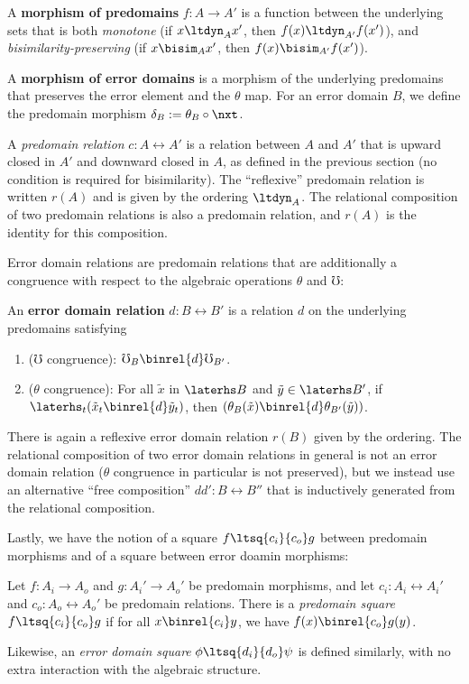 \documentclass[acmsmall, screen]{acmart}
\theoremstyle{remark}
\begin{document}
A \textbf{morphism of predomains} $f : A \to A'$ is a function between the
underlying sets that is both \emph{monotone} (if $x \ltdyn_A x'$, then $f(x)
\ltdyn_{A'} f(x')$), and \emph{bisimilarity-preserving} (if $x \bisim_A x'$,
then $f(x) \bisim_{A'} f(x')$).

A \textbf{morphism of error domains} is a morphism of the underlying predomains
that preserves the error element and the $\theta$ map.
%
For an error domain $B$, we define the predomain morphism $\delta_B := \theta_B
\circ \nxt$.

A \emph{predomain relation} $c : A \rel A'$ is a relation between $A$ and $A'$
that is upward closed in $A'$ and downward closed in $A$, as defined in the
previous section (no condition is required for bisimilarity). The ``reflexive''
predomain relation is written $r(A)$ and is given by the ordering $\ltdyn_A$.
The relational composition of two predomain relations is also a predomain
relation, and $r(A)$ is the identity for this composition.

Error domain relations are predomain relations that are additionally a
congruence with respect to the algebraic operations $\theta$ and $\mho$:
%
\begin{definition}
  An \textbf{error domain relation} $d : B \rel B'$ is a relation $d$ on the
  underlying predomains satisfying
  \begin{enumerate}
     \item ($\mho$ congruence): $\mho_B \binrel{d} \mho_{B'}$.
     \item ($\theta$ congruence): For all $\tilde{x}$ in $\laterhs B$ and
     $\tilde{y} \in \laterhs B'$, if $\laterhs_t (\tilde{x}_t \binrel{d}
     \tilde{y}_t)$, then $(\theta_B (\tilde{x}) \binrel{d} \theta_{B'}
     (\tilde{y}))$. 
  \end{enumerate}
\end{definition}
%
There is again a reflexive error domain relation $r(B)$ given by the ordering.
The relational composition of two error domain relations in general is not an
error domain relation ($\theta$ congruence in particular is not preserved), but
we instead use an alternative ``free composition'' $dd' : B \rel B''$ that is
inductively generated from the relational composition.

Lastly, we have the notion of a square $f \ltsq{c_i}{c_o} g$ between predomain
morphisms and of a square between error doamin morphisms:

\begin{definition}
Let $f : A_i \to A_o$ and $g : A_i' \to A_o'$ be predomain morphisms, and let
$c_i : A_i \rel A_i'$ and $c_o : A_o \rel A_o'$ be predomain relations. There is
a \emph{predomain square} $f \ltsq{c_i}{c_o} g$ if for all $x \binrel{c_i} y$,
we have $f(x) \binrel{c_o} g(y)$. 

Likewise, an \emph{error domain square} $\phi \ltsq{d_i}{d_o} \psi$ is defined
similarly, with no extra interaction with the algebraic structure.
\end{definition}
\end{document}
